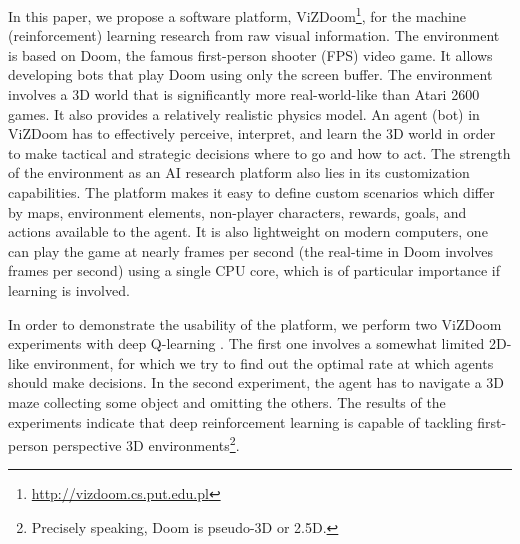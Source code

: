 \documentclass[english,american,conference, balance]{IEEEtran}
\begin{document}
\begin{comment}
Paragraph 3: 

\char`\"{}In this paper, we show that ...\char`\"{}. This is the key
paragraph in the intro - you summarize, in one paragraph, what are
the main contributions of your paper given the context you have established
in paragraphs 1 and 2. What is the general approach taken? Why are
the specific results significant? This paragraph must be really really
good. If you can't \char`\"{}sell\char`\"{} your work at a high level
in a paragraph in the intro, then you are in trouble. As a reader
or reviewer, this is the paragraph that I always look for, and read
very carefully.
\end{comment}

In this paper, we propose a software platform, ViZDoom\footnote{\url{http://vizdoom.cs.put.edu.pl}},
for the machine (reinforcement) learning research from raw visual
information. The environment is based on Doom, the famous first-person
shooter (FPS) video game. It allows developing bots that play Doom
using only the screen buffer. The environment involves a 3D world
that is significantly more real-world-like than Atari 2600 games.
It also provides a relatively realistic physics model. An agent (bot)
in ViZDoom has to effectively perceive, interpret, and learn the 3D
world in order to make tactical and strategic decisions where to go
and how to act. The strength of the environment as an AI research
platform also lies in its customization capabilities. The platform
makes it easy to define custom scenarios which differ by maps, environment
elements, non-player characters, rewards, goals, and actions available
to the agent. It is also lightweight \textendash{} on modern computers,
one can play the game at nearly  frames per second (the real-time
in Doom involves  frames per second)  using a single CPU core,
which is of particular importance if learning is involved.

In order to demonstrate the usability of the platform, we perform
two ViZDoom experiments with deep Q-learning \cite{mnih-dqn-2015}.
The first one involves a somewhat limited 2D-like environment, for
which we try to find out the optimal rate at which agents should make
decisions. In the second experiment, the agent has to navigate a 3D
maze collecting some object and omitting the others. The results of
the experiments indicate that deep reinforcement learning is capable
of tackling  first-person perspective 3D environments\footnote{Precisely speaking, Doom is pseudo-3D or 2.5D.}.
\end{document}
